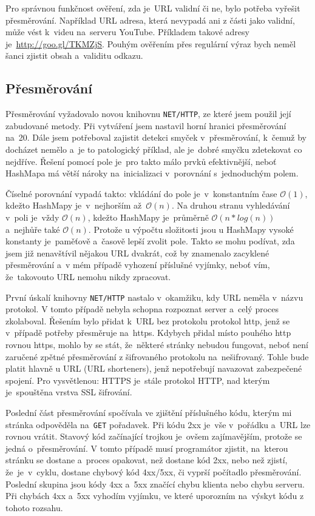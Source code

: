 \par Pro správnou funkčnost ověření, zda je~URL validní či ne, bylo potřeba vyřešit přesměrování. Například URL adresa, která nevypadá ani z části jako validní, může vést k~videu na~serveru YouTube. Příkladem takové adresy je~\url{http://goo.gl/TKMZjS}. Pouhým ověřením přes regulární výraz bych neměl šanci zjistit obsah a~validitu odkazu. 

\subsection{Přesměrování}
\par Přesměrování\cite{nethttp} vyžadovalo novou knihovnu \texttt{NET/HTTP}, ze které jsem použil její zabudované metody. Při vytváření jsem nastavil horní hranici přesměrování na~20. Dále jsem potřeboval zajistit detekci smyček v~přesměrování, k~čemuž by docházet nemělo a~je to patologický příklad, ale je~dobré smyčku zdetekovat co nejdříve. Řešení pomocí pole je~pro takto málo prvků efektivnější, neboť HashMapa má větší nároky na~inicializaci v~porovnání s~jednoduchým polem. 
\par Číselné porovnání vypadá takto: vkládání do pole je~v~konstantním čase $\mathcal{O}(1)$, kdežto HashMapy je~v~nejhorším až~$\mathcal{O}(n)$. Na druhou stranu vyhledávání v~poli je~vždy $\mathcal{O}(n)$, kdežto HashMapy je~průměrně $\mathcal{O}(n * log(n))$ a~nejhůře také $\mathcal{O}(n)$. Protože u výpočtu složitosti jsou u HashMapy vysoké konstanty je~paměťově a~časově lepší zvolit pole. Takto se mohu podívat, zda jsem již nenavštívil nějakou URL dvakrát, což by znamenalo zacyklené přesměrování a~v mém případě vyhození příslušné vyjímky, neboť vím, že~takovouto URL nemohu nikdy zpracovat.

\par První úskalí knihovny \texttt{NET/HTTP}\cite{nethttp} nastalo v~okamžiku, kdy URL neměla v~názvu protokol. V tomto případě nebyla schopna rozpoznat server a~celý proces zkolaboval. Řešením bylo přidat k~URL bez protokolu protokol http, jenž se v~případě potřeby přesměruje na~https. Kdybych přidal místo pouhého http rovnou https, mohlo by se stát, že~některé stránky nebudou fungovat, neboť není zaručené zpětné přesměrování z šifrovaného protokolu na~nešifrovaný. Tohle bude platit hlavně u  URL (URL shorteners), jenž nepotřebují navazovat zabezpečené spojení. Pro vysvětlenou: HTTPS je~stále protokol HTTP, nad kterým je~spouštěna vrstva SSL šifrování.
\par Poslední část přesměrování spočívala ve zjištění příslušného kódu, kterým mi stránka odpověděla na~\texttt{GET} pořadavek. Při kódu 2xx je~vše v~pořádku a~URL lze rovnou vrátit. Stavový kód začínající trojkou je~ovšem zajímavějším, protože se jedná o~přesměrování. V tomto případě musí programátor zjistit, na~kterou stránku se dostane a~proces opakovat, než dostane kód 2xx, nebo než zjistí, že~je~v~cyklu, dostane chybový kód 4xx/5xx, či vyprší počítadlo přesměrování. Poslední skupina jsou kódy 4xx a~5xx značící chybu klienta nebo chybu serveru. Při chybách 4xx a~5xx vyhodím vyjímku, ve které uporozním na~výskyt kódu z tohoto rozsahu.


